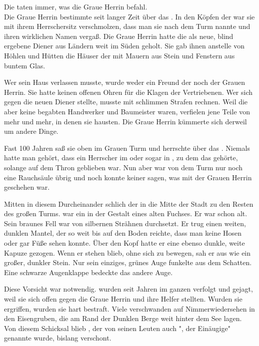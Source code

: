 \begin{huge}
Die {\Bangiri} taten immer, was die Graue Herrin befahl.\\
Die Graue Herrin bestimmte seit langer Zeit über das {\Enland}. In den Köpfen der {\Enlaender} war sie mit ihrem Herrschersitz verschmolzen, dass man sie nach dem Turm nannte und ihren wirklichen Namen vergaß. Die Graue Herrin hatte die {\Bangiri} als neue, blind ergebene Diener aus Ländern weit im Süden geholt. Sie gab ihnen anstelle von Höhlen und Hütten die Häuser der {\Enlaender} mit Mauern aus Stein und Fenstern aus buntem Glas. 

Wer sein Haus verlassen musste, wurde weder ein Freund der {\Bangiri} noch der Grauen Herrin. Sie hatte keinen offenen Ohren für die Klagen der Vertriebenen. Wer sich gegen die neuen Diener stellte, musste mit schlimmen Strafen rechnen. Weil die {\Bangiri} aber keine begabten Handwerker und Baumeister waren, verfielen jene Teile von {\Tern} mehr und mehr, in denen sie hausten. Die Graue Herrin kümmerte sich derweil um andere Dinge. 

Fast 100 Jahren saß sie oben im Grauen Turm und herrschte über das {\Enland}. Niemals hatte man gehört, dass ein Herrscher im {\Enland} oder sogar in {\Rhingell}, zu dem das {\Enland} gehörte, solange auf dem Thron geblieben war. Nun aber war von dem Turm nur noch eine Rauchsäule übrig und noch konnte keiner sagen, was mit der Grauen Herrin geschehen war. 

Mitten in diesem Durcheinander schlich {\Eno} der {\Schattenlaufer} in die Mitte der Stadt zu den Resten des großen Turms. {\Eno} war ein {\Enlaender} in der Gestalt eines alten Fuchses. Er war schon alt. Sein braunes Fell war von silbernen Strähnen durchsetzt. Er trug einen weiten, dunklen Mantel, der so weit bis auf den Boden reichte, dass man keine Hosen oder gar Füße sehen konnte. Über den Kopf hatte er eine ebenso dunkle, weite Kapuze gezogen. Wenn er stehen blieb, ohne sich zu bewegen, sah er aus wie ein großer, dunkler Stein. Nur sein einziges, grünes Auge funkelte aus dem Schatten. Eine schwarze Augenklappe bedeckte das andere Auge.

Diese Vorsicht war notwendig. {\Schattenlaufer} wurden seit Jahren im ganzen {\Enland} verfolgt und gejagt, weil sie sich offen gegen die Graue Herrin und ihre Helfer stellten. Wurden sie ergriffen, wurden sie hart bestraft. Viele verschwanden auf Nimmerwiedersehen in den Eisengruben, die am Rand der Dunklen Berge weit hinter dem See lagen.\\
Von diesem Schicksal blieb {\Eno}, der von seinen Leuten auch "{\Eno}, der Einäugige" genannte wurde, bislang verschont. 


\end{huge}
